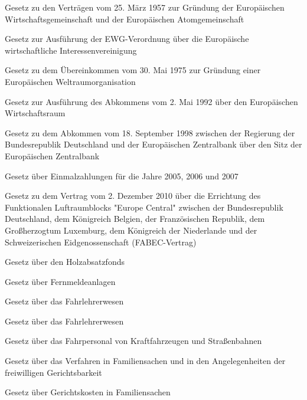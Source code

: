 \item[{EWGVtrG}] Gesetz zu den Verträgen vom 25. März 1957 zur Gründung der Europäischen Wirtschaftsgemeinschaft und der Europäischen Atomgemeinschaft

\item[{EWIVAG}] Gesetz zur Ausführung der EWG-Verordnung über die Europäische wirtschaftliche Interessenvereinigung

\item[{EWOÜbkG}] Gesetz zu dem Übereinkommen vom 30. Mai 1975 zur Gründung einer Europäischen Weltraumorganisation

\item[{EWRAbkAG}] Gesetz zur Ausführung des Abkommens vom 2. Mai 1992 über den Europäischen Wirtschaftsraum

\item[{EZBAbkG}] Gesetz zu dem Abkommen vom 18. September 1998 zwischen der Regierung der Bundesrepublik Deutschland und der Europäischen Zentralbank über den Sitz der Europäischen Zentralbank

\item[{EzG-2007}] Gesetz über Einmalzahlungen für die Jahre 2005, 2006 und 2007

\item[{FABECVtrG}] Gesetz zu dem Vertrag vom 2. Dezember 2010 über die Errichtung des Funktionalen Luftraumblocks "Europe Central" zwischen der Bundesrepublik Deutschland, dem Königreich Belgien, der Französischen Republik, dem Großherzogtum Luxemburg, dem Königreich der Niederlande und der Schweizerischen Eidgenossenschaft (FABEC-Vertrag)

\item[{FAfG}] Gesetz über den Holzabsatzfonds

\item[{FAG}] Gesetz über Fernmeldeanlagen

\item[{FahrlG}] Gesetz über das Fahrlehrerwesen

\item[{FahrlG-2018}] Gesetz über das Fahrlehrerwesen

\item[{FahrpersStG}] Gesetz über das Fahrpersonal von Kraftfahrzeugen und Straßenbahnen

\item[{FamFG}] Gesetz über das Verfahren in Familiensachen und in den Angelegenheiten der freiwilligen Gerichtsbarkeit

\item[{FamGKG}] Gesetz über Gerichtskosten in Familiensachen

